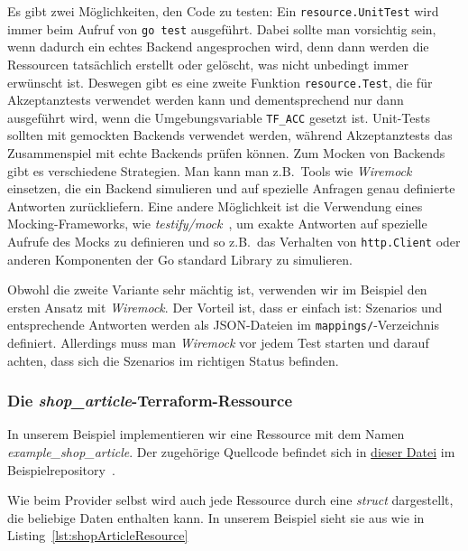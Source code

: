 \documentclass[paper=a4,11pt,numbers=noenddot]{article}
\begin{document}
Es gibt zwei Möglichkeiten, den Code zu testen: Ein \verb'resource.UnitTest' wird immer beim Aufruf von \verb'go test' ausgeführt. Dabei sollte man vorsichtig sein, wenn dadurch ein echtes Backend angesprochen wird, denn dann werden die Ressourcen tatsächlich erstellt oder gelöscht, was nicht unbedingt immer erwünscht ist. Deswegen gibt es eine zweite Funktion \verb'resource.Test', die für Akzeptanztests verwendet werden kann und dementsprechend nur dann ausgeführt wird, wenn die Umgebungsvariable \verb'TF_ACC' gesetzt ist. Unit-Tests sollten mit gemockten Backends verwendet werden, während Akzeptanztests das Zusammenspiel mit echte Backends prüfen können. Zum Mocken von Backends gibt es verschiedene Strategien. Man kann man z.B.\ Tools wie \emph{Wiremock}~\autocite{noauthor_wiremock_nodate} einsetzen, die ein Backend simulieren und auf spezielle Anfragen genau definierte Antworten zurückliefern. Eine andere Möglichkeit ist die Verwendung eines Mocking-Frameworks, wie \emph{testify/mock}~\autocite{noauthor_testifymock_nodate}, um exakte Antworten auf spezielle Aufrufe des Mocks zu definieren und so z.B.\ das Verhalten von \verb'http.Client' oder anderen Komponenten der Go standard Library zu simulieren.

Obwohl die zweite Variante sehr mächtig ist, verwenden wir im Beispiel den ersten Ansatz mit \emph{Wiremock}. Der Vorteil ist, dass er einfach ist: Szenarios und entsprechende Antworten werden als JSON-Dateien im \verb'mappings/'-Verzeichnis definiert. Allerdings muss man \emph{Wiremock} vor jedem Test starten und darauf achten, dass sich die Szenarios im richtigen Status befinden.

\subsubsection{Die \emph{shop\_article}-Terraform-Ressource}
\label{subsec:emphsh-reso}

In unserem Beispiel implementieren wir eine Ressource mit dem Namen \emph{example\_shop\_article}. Der zugehörige Quellcode befindet sich in \href{https://github.com/ecky-l/terraform-provider-example/blob/main/src/tfp-example/example/shop_article_resource.go}{dieser Datei} im Beispielrepository~\autocite{ecky-l_terraform-provider-example_nodate}.

Wie beim Provider selbst wird auch jede Ressource durch eine \emph{struct} dargestellt, die beliebige Daten enthalten kann. In unserem Beispiel sieht sie aus wie in Listing~\ref{lst:shopArticleResource}
\end{document}
